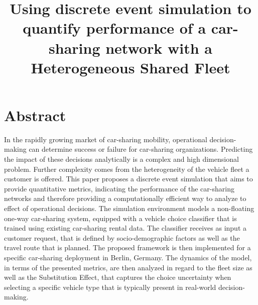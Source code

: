 \documentclass[a4paper, oneside, 12pt]{article}
\title{Using discrete event simulation to quantify performance of a car-sharing network with a Heterogeneous Shared Fleet}
\begin{document}




\clearpage
\thispagestyle{empty}
\section*{Abstract}


In the rapidly growing market of car-sharing mobility, operational decision-making
can determine success or failure for car-sharing organizations. Predicting the impact
of these decisions analytically is a complex and high dimensional problem. Further complexity
comes from the heterogeneity of the vehicle fleet a customer is offered.
This paper proposes
a discrete event simulation that aims to provide quantitative metrics,
indicating the performance of the car-sharing networks and therefore providing a computationally
efficient way to analyze to effect of operational decisions. The simulation environment models a non-floating
one-way car-sharing system, equipped with a vehicle choice classifier that
is trained using existing car-sharing rental data. The classifier receives as input
a customer request, that is defined by socio-demographic factors as well as the travel route that is planned.
The proposed framework is then implemented for a specific car-sharing deployment in Berlin, Germany.
The dynamics of the model, in terms of the presented metrics,
are then analyzed in regard to the fleet size as well as the Substitution Effect, that
captures the choice uncertainty when selecting a specific vehicle type
that is typically present in real-world
decision-making. 



\clearpage
{}
\tableofcontents
\clearpage
\listoffigures
\clearpage
\listoftables
\clearpage



\end{document}
